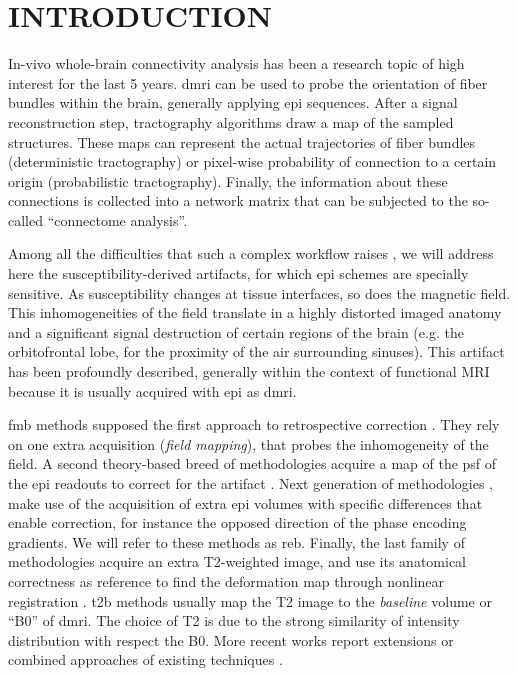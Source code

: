 \section{INTRODUCTION}

In-vivo whole-brain connectivity analysis has been a
research topic of high interest for the last
5 years. 
\Gls*{dmri} can be used to probe the
orientation of fiber bundles within the brain,
generally applying \gls*{epi} sequences.
After a signal reconstruction step, 
tractography algorithms draw a map of the sampled 
structures.
These maps can represent the actual trajectories
of fiber bundles (deterministic tractography) or
pixel-wise probability of connection to a certain origin
(probabilistic tractography). Finally, the
information about these connections is collected
into a network matrix that can be subjected to
the so-called ``connectome analysis''.

Among all the difficulties that such a complex workflow
raises \cite{jones_twenty-five_2010}, we will
address here the susceptibility-derived artifacts,
for which \Gls*{epi} schemes are specially sensitive.
As susceptibility changes at tissue interfaces,
so does the magnetic field. This inhomogeneities 
of the field translate in a highly distorted imaged 
anatomy and a significant signal  destruction of 
certain regions of the brain 
(e.g. the orbitofrontal lobe, for the proximity of the
air surrounding sinuses). This artifact has been
profoundly described, generally within the context of
functional MRI because it is usually acquired with 
\gls*{epi} as \gls*{dmri}. 

\Gls*{fmb} methods supposed the first approach to retrospective
correction \cite{jezzard_correction_1995}. They rely on one
extra acquisition (\emph{field mapping}), that probes the 
inhomogeneity of the field.
A second theory-based breed of methodologies acquire a 
map of the \acrlong*{psf} of the \gls*{epi} readouts to correct 
for the artifact \cite{robson_measurement_1997}. 
Next generation of methodologies \cite{cordes_geometric_2000,
chiou_simple_2000}, make use of the acquisition of 
extra \gls*{epi} volumes 
with specific differences that enable correction, for instance
the opposed direction of the phase encoding gradients. We will
refer to these methods as \gls*{reb}.
Finally, the last family of methodologies acquire an 
extra T2-weighted image, and use its anatomical correctness 
as reference to find the deformation map through nonlinear 
registration \cite{kybic_unwarping_2000,studholme_accurate_2000}.
\gls*{t2b} methods usually map
the T2 image to the \emph{baseline} volume or ``B0''
of \gls*{dmri}. The choice of T2 is due to the strong
similarity of intensity distribution with respect the B0.
More recent works report extensions or combined
approaches of existing techniques
\cite{andersson_how_2003,zaitsev_point_2004,%
holland_efficient_2010,andersson_comprehensive_2012}.

